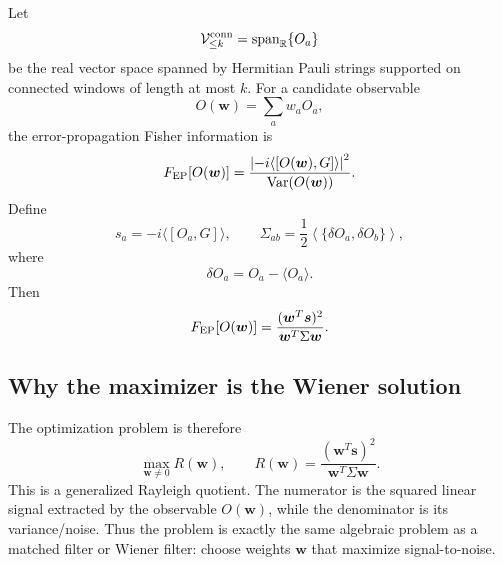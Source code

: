 \documentclass[11pt]{article}
\newcommand{\V}{\mathcal V}
\newcommand{\FEP}{F_{\rm EP}}
\newcommand{\dd}{\delta}
\begin{document}
Let
\[
  \V_{\le k}^{\rm conn}
  =
  \mathrm{span}_{\mathbb R}\{O_a\}
\]
be the real vector space spanned by Hermitian Pauli strings supported on
connected windows of length at most $k$.
For a candidate observable
\[
  O(\bm w)=\sum_a w_a O_a,
\]
the error-propagation Fisher information is
\begin{equation}
  \FEP[O(\bm w)]
  =
  \frac{
    \left|-i\langle[O(\bm w),G]\rangle\right|^2
  }{
    \mathrm{Var}(O(\bm w))
  }.
\end{equation}
Define
\begin{equation}
  s_a
  =
  -i\langle[O_a,G]\rangle,
  \qquad
  \Sigma_{ab}
  =
  \frac12
  \left\langle
    \{\dd O_a,\dd O_b\}
  \right\rangle,
\end{equation}
where
\[
  \dd O_a=O_a-\langle O_a\rangle .
\]
Then
\begin{equation}
  \FEP[O(\bm w)]
  =
  \frac{(\bm w^T\bm s)^2}{\bm w^T\Sigma\bm w}.
\end{equation}

\subsection{Why the maximizer is the Wiener solution}

The optimization problem is therefore
\begin{equation}
  \max_{\bm w\ne 0}
  R(\bm w),
  \qquad
  R(\bm w)
  =
  \frac{(\bm w^T\bm s)^2}{\bm w^T\Sigma\bm w}.
  \label{eq:rayleigh}
\end{equation}
This is a generalized Rayleigh quotient.  The numerator is the squared
linear signal extracted by the observable $O(\bm w)$, while the
denominator is its variance/noise.  Thus the problem is exactly the
same algebraic problem as a matched filter or Wiener filter: choose
weights $\bm w$ that maximize signal-to-noise.
\end{document}
